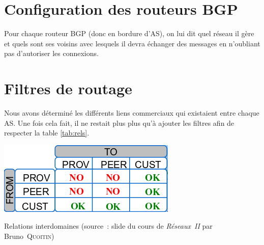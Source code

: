 \documentclass[10pt,a4paper,twocolumn]{article}
\begin{document}
\section{Configuration des routeurs BGP}
Pour chaque routeur BGP (donc en bordure d'AS), on lui dit quel réseau il gère et quels sont ses voisins avec lesquels il devra échanger des messages en n'oubliant pas d'autoriser les connexions.

\section{Filtres de routage}
Nous avons déterminé les différents liens commerciaux qui existaient entre chaque AS. Une fois cela fait, il ne restait plus plus qu'à ajouter les filtres afin de respecter la table \ref{tab:rels}.
\begin{table}[h]
	\center
	\includegraphics[width=0.5\columnwidth]{comlink.png}
	\caption{Relations interdomaines (source~: slide du cours de \textit{Réseaux~II} par Bruno~\textsc{Quoitin})}
	\label{tab:rels}
\end{table}
\end{document}
